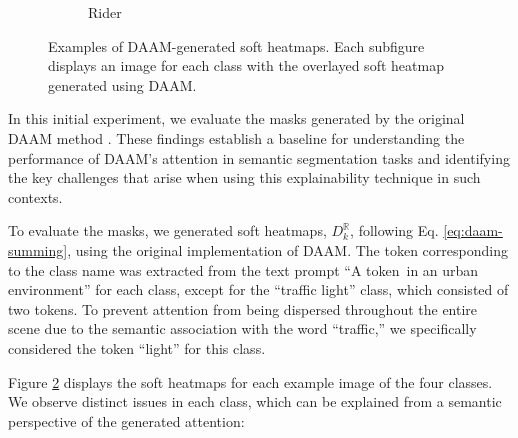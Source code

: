 \begin{figure}
\begin{subfigure}{0.24\columnwidth}
   \caption{Rider}
   \label{subfig:dataset-example-rider-daam}
  \end{subfigure}
  \caption[Examples of DAAM-generated soft heatmaps]{Examples of DAAM-generated soft heatmaps. Each subfigure displays an image for each class with the overlayed soft heatmap generated using DAAM.}
  \label{fig:dataset-examples-daam}
  \end{figure}

In this initial experiment, we evaluate the masks generated by the original DAAM method \cite{DAAM}. These findings establish a baseline for understanding the performance of DAAM's attention in semantic segmentation tasks and identifying the key challenges that arise when using this explainability technique in such contexts.

To evaluate the masks, we generated soft heatmaps, $D^{\mathbb{R}}_k$, following Eq. \ref{eq:daam-summing}, using the original implementation of DAAM. The token corresponding to the class name was extracted from the text prompt ``A \textlangle token\textrangle\ in an urban environment'' for each class, except for the ``traffic light'' class, which consisted of two tokens. To prevent attention from being dispersed throughout the entire scene due to the semantic association with the word ``traffic,'' we specifically considered the token ``light'' for this class.

Figure \ref{fig:dataset-examples-daam} displays the soft heatmaps for each example image of the four classes. We observe distinct issues in each class, which can be explained from a semantic perspective of the generated attention:

